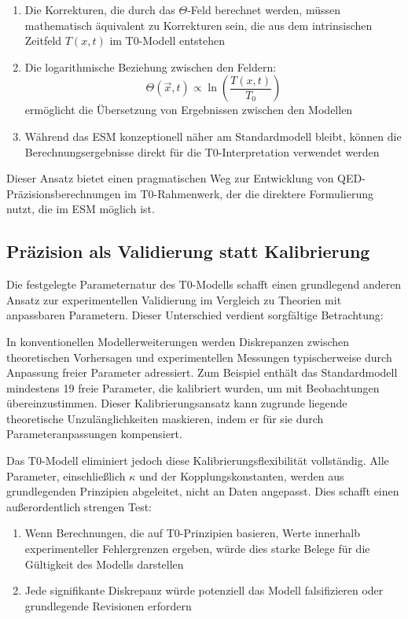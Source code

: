 \documentclass[12pt,a4paper]{article}
\newcommand{\Tfieldt}{T(x,t)}
\newcommand{\Tzero}{T_0}
\newcommand{\vecx}{\vec{x}}
\begin{document}
	\begin{enumerate}
		\item Die Korrekturen, die durch das $\Theta$-Feld berechnet werden, müssen mathematisch äquivalent zu Korrekturen sein, die aus dem intrinsischen Zeitfeld $\Tfieldt$ im T0-Modell entstehen
		\item Die logarithmische Beziehung zwischen den Feldern:
		\begin{equation}
			\Theta(\vecx,t) \propto \ln\left(\frac{\Tfieldt}{\Tzero}\right)
			\label{eq:log_relationship}
		\end{equation}
		ermöglicht die Übersetzung von Ergebnissen zwischen den Modellen
		\item Während das ESM konzeptionell näher am Standardmodell bleibt, können die Berechnungsergebnisse direkt für die T0-Interpretation verwendet werden
	\end{enumerate}
	
	Dieser Ansatz bietet einen pragmatischen Weg zur Entwicklung von QED-Präzisionsberechnungen im T0-Rahmenwerk, der die direktere Formulierung nutzt, die im ESM möglich ist.
	
	\subsection{Präzision als Validierung statt Kalibrierung}
	\label{subsec:precision_validation}
	
	Die festgelegte Parameternatur des T0-Modells schafft einen grundlegend anderen Ansatz zur experimentellen Validierung im Vergleich zu Theorien mit anpassbaren Parametern. Dieser Unterschied verdient sorgfältige Betrachtung:
	
	In konventionellen Modellerweiterungen werden Diskrepanzen zwischen theoretischen Vorhersagen und experimentellen Messungen typischerweise durch Anpassung freier Parameter adressiert. Zum Beispiel enthält das Standardmodell mindestens 19 freie Parameter, die kalibriert wurden, um mit Beobachtungen übereinzustimmen. Dieser Kalibrierungsansatz kann zugrunde liegende theoretische Unzulänglichkeiten maskieren, indem er für sie durch Parameteranpassungen kompensiert.
	
	Das T0-Modell eliminiert jedoch diese Kalibrierungsflexibilität vollständig. Alle Parameter, einschließlich $\kappa$ und der Kopplungskonstanten, werden aus grundlegenden Prinzipien abgeleitet, nicht an Daten angepasst. Dies schafft einen außerordentlich strengen Test:
	
	\begin{enumerate}
		\item Wenn Berechnungen, die auf T0-Prinzipien basieren, Werte innerhalb experimenteller Fehlergrenzen ergeben, würde dies starke Belege für die Gültigkeit des Modells darstellen
		\item Jede signifikante Diskrepanz würde potenziell das Modell falsifizieren oder grundlegende Revisionen erfordern
	\end{enumerate}
	
\end{document}
